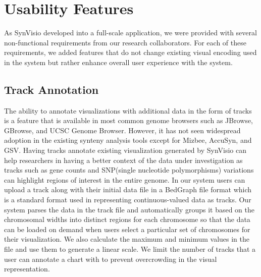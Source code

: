 \section{Usability Features}
As SynVisio developed into a full-scale application, we were provided with several non-functional requirements from our research collaborators. For each of these requirements, we added features that do not change existing visual encoding used in the system but rather enhance overall user experience with the system. 

\subsection{Track Annotation}
The ability to annotate visualizations with additional data in the form of tracks is a feature that is available in most common genome browsers such as JBrowse, GBrowse, and UCSC Genome Browser\cite{skinner2009jbrowse,donlin2009using,karolchik2003ucsc}. However, it has not seen widespread adoption in the existing synteny analysis tools except for Mizbee,  AccuSyn, and GSV\cite{Meyer2009,accusyn,revanna2012web}.  Having tracks annotate existing visualization generated by SynVisio can help researchers in having a better context of the data under investigation as tracks such as gene counts and SNP(single nucleotide polymorphisms) variations can highlight regions of interest in the entire genome. In our system users can upload a track along with their initial data file in a BedGraph file format which is a standard format used in representing continuous-valued data as tracks. Our system parses the data in the track file and automatically groups it based on the chromosomal widths into distinct regions for each chromosome so that the data can be loaded on demand when users select a particular set of chromosomes for their visualization. We also calculate the maximum and minimum values in the file and use them to generate a linear scale. We limit the number of tracks that a user can annotate a chart with to prevent overcrowding in the visual representation.

